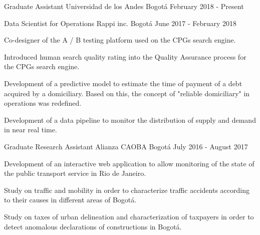 


\begin{cventries}
    \cventry
    {Graduate Assistant}
    {Universidad de los Andes}
    {Bogotá}
    {February 2018 - Present}
    {
    }

    \cventry
    {Data Scientist for Operations} %
    {Rappi inc.} %
    {Bogotá} %
    {June 2017 - February 2018} %
    {
        \begin{cvitems}
        \item{Co-designer of the A / B testing platform used on the CPGs search engine.}
        \item{Introduced human search quality rating into the Quality Assurance process for the CPGs search engine.}
        \item{Development of a predictive model to estimate the time of payment of a debt acquired by a domiciliary. Based on this, the concept of "reliable domiciliary" in operations was redefined.}
        \item{Development of a data pipeline to monitor the distribution of supply and demand in near real time.}
        \end{cvitems}
    } %


    \cventry
    {Graduate Research Assistant} %
    {Alianza CAOBA} %
    {Bogotá} %
    {July 2016 - August 2017} %
    {
        \begin{cvitems}
        \item{Development of an interactive web application to allow monitoring of the state of the public transport service in Rio de Janeiro.}
        \item{Study on traffic and mobility in order to characterize traffic accidents according to their causes in different areas of Bogotá.}
        \item{Study on taxes of urban delineation and characterization of taxpayers in order to detect anomalous declarations of constructions in Bogotá.}
        \end{cvitems}
    } %


    \vspace{-0.5cm}
\end{cventries}
